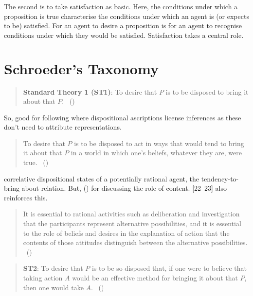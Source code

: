 \documentclass[10pt]{article}
\begin{document}
The second is to take satisfaction as basic.
Here, the conditions under which a proposition is true characterise the conditions under which an agent is (or expects to be) satisfied.
For an agent to desire a proposition is for an agent to recognise conditions under which they would be satisfied.
Satisfaction takes a central role.



\section{Schroeder's Taxonomy}
\label{sec:schroeders-taxonomy}

\begin{quote}
  \textbf{Standard Theory 1 (ST1)}:
  To desire that \(P\) is to be disposed to bring it about that \(P\).\nolinebreak
  \mbox{ }\hfill(\citeyear[11]{Schroeder:2004aa})
\end{quote}

So, good for following \citeauthor{Ryle:1949aa} where dispositional ascriptions license inferences as these don't need to attribute representations.

\begin{quote}
  To desire that \(P\) is to be disposed to act in ways that would tend to bring it about that \(P\) in a world in which one's beliefs, whatever they are, were true.\nolinebreak
  \mbox{ }\hfill(\citeyear[15]{Stalnaker:1984aa})
\end{quote}
{\color{red} correlative dispositional states of a potentially rational agent, the tendency-to-bring-about relation. But, (\citeyear[18]{Stalnaker:1984aa}) for \citeauthor{Stalnaker:1984aa} discussing the role of content. [22--23] also reinforces this.
    \begin{quote}
      It is essential to rational activities such as deliberation and investigation that the participants represent alternative possibilities, and it is essential to the role of beliefs and desires in the explanation of action that the contents of those attitudes distinguish between the alternative possibilities.\nolinebreak
      \mbox{ }\hfill(\citeyear[23]{Stalnaker:1984aa})
    \end{quote}
  }
  
\begin{quote}
  \textbf{ST2}:
  To desire that \(P\) is to be so disposed that, if one were to believe that taking action \(A\) would be an effective method for bringing it about that \(P\), then one would take \(A\).\nolinebreak
  \mbox{ }\hfill(\citeyear[17]{Schroeder:2004aa})
\end{quote}
\end{document}
